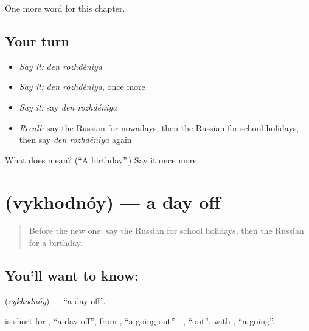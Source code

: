 \begin{grammarlens}[title={What you've built}]
One more word for this chapter.
\end{grammarlens}

\subsection*{Your turn}
\begin{itemize}
\raggedright
  \item \emph{Say it:} \emph{den rozhdéniya}
  \item \emph{Say it:} \emph{den rozhdéniya}, once more
  \item \emph{Say it:} say \emph{den rozhdéniya}
  \item \emph{Recall:} say the Russian for nowadays, then the Russian for school holidays, then say \emph{den rozhdéniya} again
\end{itemize}

\begin{tcolorbox}[breakable,colback=teal!4,colframe=teal!35!black,title={Before you move on}]
What does   mean? (\textquotedblleft{}A birthday\textquotedblright{}.) Say it once more.
\end{tcolorbox}
\section[\texorpdfstring{\ru{выходной} (vykhodnóy)}{выходной (vykhodnóy)}]{ (vykhodnóy) — a day off}

\label{lesson:RU-C182-vykhodnoy}



\begin{quote}
Before the new one: say the Russian for school holidays, then the Russian for a birthday.
\end{quote}

\subsection*{You'll want to know: }
\textbf{} (\emph{vykhodnóy}) — \textquotedblleft{}a day off\textquotedblright{}.

\begin{cousinweb}
\textbf{} is short for \emph{ }, \textquotedblleft{}a day off\textquotedblright{}, from \emph{}, \textquotedblleft{}a going out\textquotedblright{}: \emph{-}, \textquotedblleft{}out\textquotedblright{}, with \emph{}, \textquotedblleft{}a going\textquotedblright{}.
\end{cousinweb}

